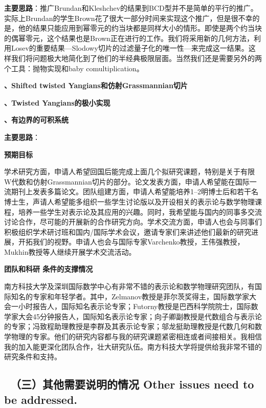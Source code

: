 \documentclass[12pt,UTF8,AutoFakeBold=4,a4paper]{ctexart}
\begin{document}
\textbf{主要思路}：推广Brundan和Kleshchev的结果到BCD型并不是简单的平行的推广。实际上Brundan的学生Brown花了很大一部分时间来实现这个推广，但是很不幸的是，他的结果只能应用到幂零元的约当块都是同样大小的情形。即使是两个约当块的偶幂零元，这个结果也是Brown正在进行的工作。我们将采用新的几何方法，利用Losev的重要结果---Slodowy切片的过滤量子化的唯一性---来完成这一结果。这样我们将问题极大地简化到了他们的半经典极限层面。当然我们还是需要另外的两个工具：抛物实现和baby comultiplication。

\medskip

\textbf{、Shifted twisted Yangians和仿射Grassmannian切片}

\medskip

\textbf{、Twisted Yangians的极小实现}

\medskip

\textbf{、有边界的可积系统}

\textbf{主要思路}：


\medskip

\textbf{\sihao 预期目标}

学术研究方面，申请人希望回国后能完成上面几个拟研究课题，特别是关于有限W代数和仿射Grassmannian切片的部分。论文发表方面，申请人希望能在国际一流期刊上发表多篇论文。团队组建方面，申请人希望能培养1--2明博士后和若干名博士生，声请人希望能多组织一些学生讨论版以及开设相关的表示论与数学物理课程，培养一些学生对表示论及其应用的兴趣。同时，我希望能与国内的同事多交流讨论合作，尽可能的开展新的合作研究方向。学术交流方面，申请人也会与同事们积极组织学术研讨班和国内/国际学术会议，邀请专家们来讲述他们最新的研究进展，开拓我们的视野。申请人也会与国际专家Varchenko教授，王伟强教授，Mukhin教授等人继续开展学术交流活动。

\medskip

\textbf{\sihao 团队和科研 条件的支撑情况}

南方科技大学及深圳国际数学中心有非常不错的表示论和数学物理研究团队，有国际知名的专家和年轻学者。其中，Zelmanov教授是菲尔茨奖得主，国际数学家大会一小时报告人，国际知名表示论专家；Futorny教授是巴西科学院院士，国际数学家大会45分钟报告人，国际知名表示论专家；向子卿副教授是代数组合与表示论的专家；冯致程助理教授是李群及其表示论专家；邬龙挺助理教授是代数几何和数学物理的专家。他们的研究内容都与我的研究课题紧密相连或者间接相关。我相信我的加入能更深化团队合作，壮大研究队伍。南方科技大学将提供给我非常不错的研究条件和支持。

\bigskip

{\color{MsBlue} \subsection{\sihao \kaishu \qquad \ \bfseries（三）其他需要说明的情况 
\xiaosihao {} Other issues need to be addressed.}}
%
\end{document}
